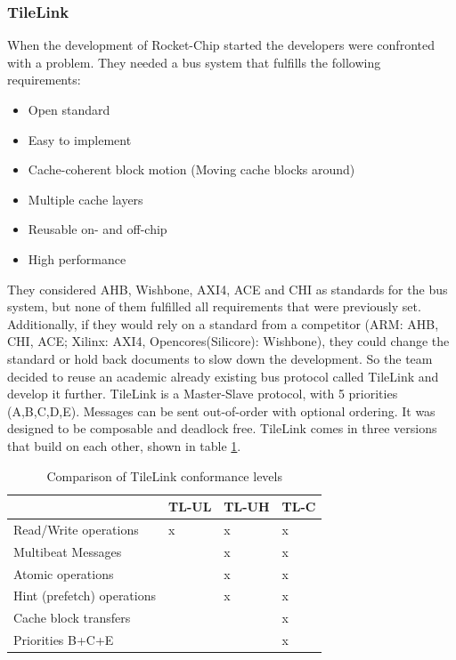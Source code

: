 \subsubsection{TileLink}\label{chapter:tilelink}
When the development of Rocket-Chip started the
developers were confronted with a problem.
They needed a bus system that fulfills the
following requirements:
\begin{itemize}
    \item Open standard
    \item Easy to implement
    \item Cache-coherent block motion (Moving cache blocks around)
    \item Multiple cache layers
    \item Reusable on- and off-chip
    \item High performance
\end{itemize}
They considered AHB, Wishbone, AXI4, ACE and CHI as
standards for the bus system, but none of them
fulfilled all requirements that were previously set.
Additionally, if they would rely on a standard from a
competitor (ARM: AHB, CHI, ACE; Xilinx: AXI4, 
Opencores(Silicore): Wishbone), they
could change the standard or hold back documents to
slow down the development.
So the team decided to reuse an academic already existing
bus protocol called TileLink and develop it further.
TileLink is a Master-Slave protocol, with 5 priorities (A,B,C,D,E).
Messages can be sent out-of-order with optional
ordering. It was designed to be composable and
deadlock free.
TileLink comes in three versions that build on each other, shown
in table \ref{tab:tilelink_levels}.
\begin{table}
    \caption{Comparison of TileLink conformance levels
        \cite[p.~10]{risc-v_tilelink}}
    \centering
    \label{tab:tilelink_levels}
    \begin{tabular}{|l|l|l|l|}
    \hline
         & TL-UL & TL-UH & TL-C \\ \hline
        Read/Write operations & x & x & x \\ \hline
        Multibeat Messages &  & x & x \\ \hline
        Atomic operations &  & x & x \\ \hline
        Hint (prefetch) operations &  & x & x \\ \hline
        Cache block transfers &  &  & x \\ \hline
        Priorities B+C+E &  &  & x \\ \hline
    \end{tabular}
\end{table}
